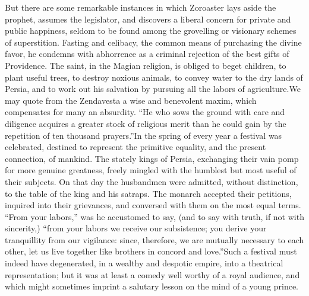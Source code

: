 But there are some remarkable instances in which Zoroaster lays
aside the prophet, assumes the legislator, and discovers a
liberal concern for private and public happiness, seldom to be
found among the grovelling or visionary schemes of superstition.
Fasting and celibacy, the common means of purchasing the divine
favor, he condemns with abhorrence as a criminal rejection of the
best gifts of Providence. The saint, in the Magian religion, is
obliged to beget children, to plant useful trees, to destroy
noxious animals, to convey water to the dry lands of Persia, and
to work out his salvation by pursuing all the labors of
agriculture.\footnotemark[1401] We may quote from the Zendavesta a wise and
benevolent maxim, which compensates for many an absurdity. “He
who sows the ground with care and diligence acquires a greater
stock of religious merit than he could gain by the repetition of
ten thousand prayers.”\footnotemark[15] In the spring of every year a festival
was celebrated, destined to represent the primitive equality, and
the present connection, of mankind. The stately kings of Persia,
exchanging their vain pomp for more genuine greatness, freely
mingled with the humblest but most useful of their subjects. On
that day the husbandmen were admitted, without distinction, to
the table of the king and his satraps. The monarch accepted their
petitions, inquired into their grievances, and conversed with
them on the most equal terms. “From your labors,” was he
accustomed to say, (and to say with truth, if not with
sincerity,) “from your labors we receive our subsistence; you
derive your tranquillity from our vigilance: since, therefore, we
are mutually necessary to each other, let us live together like
brothers in concord and love.”\footnotemark[16] Such a festival must indeed
have degenerated, in a wealthy and despotic empire, into a
theatrical representation; but it was at least a comedy well
worthy of a royal audience, and which might sometimes imprint a
salutary lesson on the mind of a young prince.





